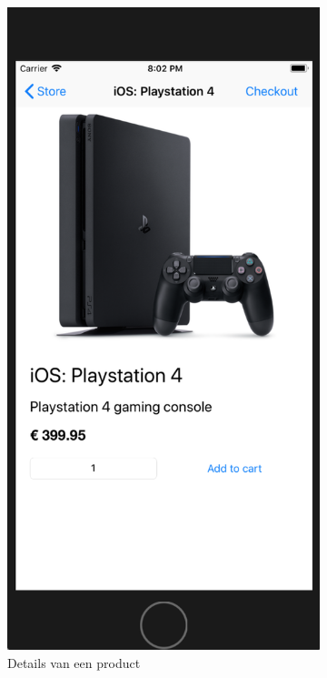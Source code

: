 \begin{figure}[H]
\begin{subfigure}{.5\textwidth}
		\includegraphics[width=0.65\linewidth]{img/poc/ios/3.png}
		\caption{Details van een product}
		\label{fig:sub1}
	\end{subfigure}%
	\begin{subfigure}{.5\textwidth}
		\centering

\end{subfigure}
\end{figure}
